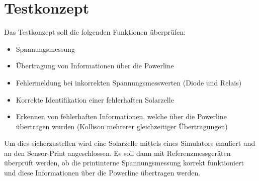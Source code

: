%
%
%
\section{Testkonzept}

Das Testkonzept soll die folgenden Funktionen überprüfen:
\begin{itemize}
	\item Spannungsmessung
	\item Übertragung von Informationen über die Powerline
	\item Fehlermeldung bei inkorrekten Spannungsmesswerten (Diode und Relais)
	\item Korrekte Identifikation einer fehlerhaften Solarzelle
	\item Erkennen von fehlerhaften Informationen, welche über die Powerline übertragen wurden (Kollison mehrerer gleichzeitiger Übertragungen)
\end{itemize}

Um dies sicherzustellen wird eine Solarzelle mittels eines Simulators emuliert und an den Sensor-Print angeschlossen. Es soll dann mit Referenzmessgeräten überprüft werden, ob die printinterne Spannungsmessung korrekt funktioniert und diese Informationen über die Powerline übertragen werden.
%

